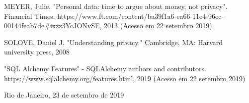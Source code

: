 \documentclass[a4paper,12pt,oneside,openany]{report}
\begin{document}
\begin{thebibliography}{}

 MEYER, Julie, "Personal data: time to argue about money, not privacy". Financial Times. https://www.ft.com/content/ba39f1a6-ea66-11e4-96ec-00144feab7de\#ixzz3YcJONvSE, 2013 (Acesso em 22 setembro 2019)

 SOLOVE, Daniel J. "Understanding privacy." Cambridge, MA: Harvard university press, 2008

 "SQL Alchemy Features" - SQLAlchemy authors and contributors. https://www.sqlalchemy.org/features.html, 2019 (Acesso em 22 setembro 2019)

\end{thebibliography}

      \vspace{2cm}
      \noindent
Rio de Janeiro, 23 de setembro de 2019

      \vspace{0.5cm}
      \begin{flushright}
         \parbox{10cm}{
            \hrulefill

            \vspace{-.375cm}

            \vspace{0.9cm}
            \hrulefill

            \vspace{-.375cm}
 
            \vspace{0.9cm}
         }
      \end{flushright}
      \vfill
      
\end{document}
